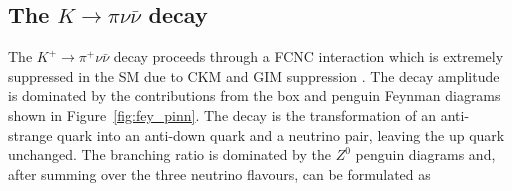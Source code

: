 \documentclass[../main.tex]{subfiles}
\begin{document}
    \subsection{The $K \to \pi \nu \bar{\nu}$ decay}\label{sec:pinn_theory}
    The $K^+ \to \pi^+ \nu \bar{\nu}$ decay proceeds through a \gls{FCNC} interaction which is extremely suppressed in the SM due to CKM and GIM suppression \cite{PhysRevD.2.1285}. The decay amplitude is dominated by the contributions from the box and penguin Feynman diagrams shown in Figure~\ref{fig:fey_pinn}. The decay is the transformation of an anti-strange quark into an anti-down quark and a neutrino pair, leaving the up quark unchanged.
    The branching ratio is dominated by the $Z^0$ penguin diagrams and, after summing over the three neutrino flavours, can be formulated as \cite{Buras2015}
\end{document}
